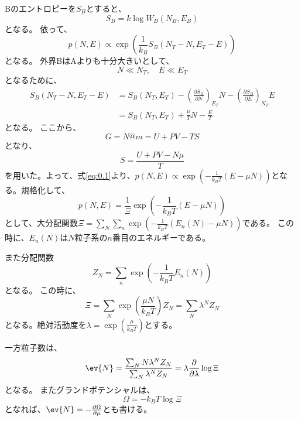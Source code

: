 \documentclass[titlepage]{ltjsarticle}
\begin{document}
Bのエントロピーを\(S_B\)とすると、
\begin{equation}
  S_B = k\log W_B(N_B,E_B)
\end{equation}
となる。
依って、
\begin{equation}\label{eq:0.1}
  p(N,E) \propto \exp\left( \frac{1}{k_B}S_B(N_T-N,E_T-E) \right)
\end{equation}
となる。
外界BはAよりも十分大きいとして、
\begin{equation}
  N \ll N_T  ,\quad E \ll E_T
\end{equation}
となるために、
\begin{align}
  S_B (N_T-N,E_T-E) &= S_B(N_T,E_T) - \left( \frac{\partial S_B}{\partial N} \right)_{E_T}N - \left( \frac{\partial S_B}{\partial E} \right)_{N_T}E \\
  &  = S_B(N_T,E_T)  + \frac{\mu}{T} N - \frac{E}{T}
\end{align}
となる。
ここから、
\begin{equation}
  G = N@m  = U + PV - TS
\end{equation}
となり、
\begin{equation}
  S = \frac{U+PV-N \mu}{T}
\end{equation}
を用いた。よって、式\eqref{eq:0.1}より、\(p(N,E)\propto \exp\left( -\frac{1}{k_BT}(E-\mu N) \right)\)となる。規格化して、
\begin{equation}
  p(N,E) = \frac{1}{\Xi} \exp\left( -\frac{1}{k_BT}(E-\mu N) \right)
\end{equation}
として、大分配関数\(\Xi = \sum_N \sum_n \exp \left( -\frac{1}{k_BT} \left( E_n(N)-\mu N \right) \right)\)である。
この時に、\(E_n(N)\)は\(N\)粒子系の\(n\)番目のエネルギーである。

また分配関数
\begin{equation}
  Z_N = \sum_n \exp \left( -\frac{1}{k_BT}E_n(N) \right)
\end{equation}
となる。
この時に、
\begin{equation}
  \Xi = \sum_N \exp \left( \frac{\mu N}{k_BT} \right)Z_N = \sum_N \lambda^N Z_N
\end{equation}
となる。絶対活動度を\(\lambda = \exp \left( \frac{\mu}{k_BT} \right)\)とする。

一方粒子数は、
\begin{equation}
  \ev{N} = \frac{\sum_N N \lambda^N Z_N}{\sum_N \lambda^N Z_N} = \lambda \pdv{}{\lambda} \log \Xi
\end{equation}
となる。
またグランドポテンシャルは、
\begin{equation}
  \Omega = -k_BT \log \Xi
\end{equation}
となれば、\(\ev{N} = - \pdv{\Omega}{\mu}\)とも書ける。
\end{document}
